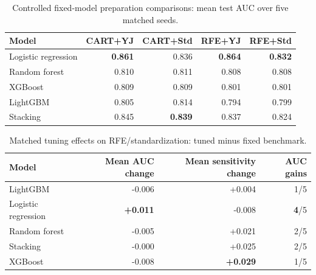 \begin{table}[H]
\centering\small
\caption{Controlled fixed-model preparation comparisons: mean test AUC over five matched seeds.}
\label{tab:holdout-preparation}
\begin{tabular}{lrrrr}
\toprule
Model & CART+YJ & CART+Std & RFE+YJ & RFE+Std \\
\midrule
Logistic regression & \textbf{0.861} & 0.836 & \textbf{0.864} & \textbf{0.832} \\
Random forest & 0.810 & 0.811 & 0.808 & 0.808 \\
XGBoost & 0.809 & 0.809 & 0.801 & 0.801 \\
LightGBM & 0.805 & 0.814 & 0.794 & 0.799 \\
Stacking & 0.845 & \textbf{0.839} & 0.837 & 0.824 \\
\bottomrule
\end{tabular}
\end{table}
\begin{table}[H]
\centering\small
\caption{Matched tuning effects on RFE/standardization: tuned minus fixed benchmark.}
\label{tab:holdout-tuning}
\begin{tabular}{lrrr}
\toprule
Model & Mean AUC change & Mean sensitivity change & AUC gains \\
\midrule
LightGBM & -0.006 & +0.004 & 1/5 \\
Logistic regression & \textbf{+0.011} & -0.008 & \textbf{4}/5 \\
Random forest & -0.005 & +0.021 & 2/5 \\
Stacking & -0.000 & +0.025 & 2/5 \\
XGBoost & -0.008 & \textbf{+0.029} & 1/5 \\
\bottomrule
\end{tabular}
\end{table}
